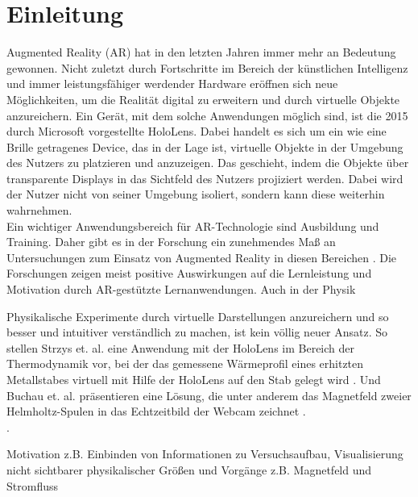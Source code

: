 \section{Einleitung}
\label{sec-1}
Augmented Reality (AR) hat in den letzten Jahren immer mehr an Bedeutung gewonnen. Nicht zuletzt durch Fortschritte im Bereich der künstlichen Intelligenz und immer leistungsfähiger werdender Hardware eröffnen sich neue Möglichkeiten, um die Realität digital zu erweitern und durch virtuelle Objekte anzureichern. Ein Gerät, mit dem solche Anwendungen möglich sind, ist die 2015 durch Microsoft vorgestellte HoloLens. Dabei handelt es sich um ein wie eine Brille getragenes Device, das in der Lage ist, virtuelle Objekte in der Umgebung des Nutzers zu platzieren und anzuzeigen. Das geschieht, indem die Objekte über transparente Displays in das Sichtfeld des Nutzers projiziert werden. Dabei wird der Nutzer nicht von seiner Umgebung isoliert, sondern kann diese weiterhin wahrnehmen.\\

Ein wichtiger Anwendungsbereich für AR-Technologie sind Ausbildung und Training. Daher gibt es in der Forschung ein zunehmendes Maß an Untersuchungen zum Einsatz von Augmented Reality in diesen Bereichen \cite{Bacca14}. Die Forschungen zeigen meist positive Auswirkungen auf die Lernleistung und Motivation durch AR-gestützte Lernanwendungen. Auch in der Physik 

Physikalische Experimente durch virtuelle Darstellungen anzureichern und so besser und intuitiver verständlich zu machen, ist kein völlig neuer Ansatz. So stellen Strzys et. al. eine Anwendung mit der HoloLens im Bereich der Thermodynamik vor, bei der das gemessene Wärmeprofil eines erhitzten Metallstabes virtuell mit Hilfe der HoloLens auf den Stab gelegt wird \cite{Strzys17}. Und Buchau et. al. präsentieren eine Lösung, die unter anderem das Magnetfeld zweier Helmholtz-Spulen in das Echtzeitbild der Webcam zeichnet \cite{Buchau09}.\\

\cite{Amiraslanov18}.  \cite{Javaheri18}

Motivation z.B. Einbinden von Informationen zu Versuchsaufbau, Visualisierung nicht sichtbarer physikalischer Größen und Vorgänge z.B. Magnetfeld und Stromfluss


